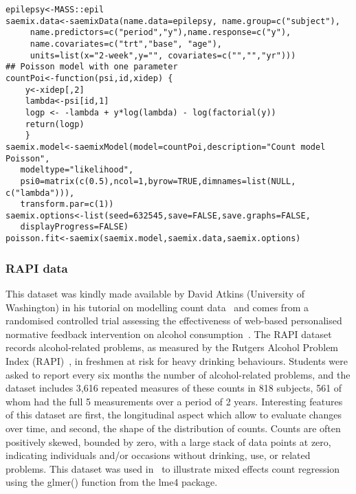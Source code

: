 \begin{verbatim}
epilepsy<-MASS::epil
saemix.data<-saemixData(name.data=epilepsy, name.group=c("subject"),
     name.predictors=c("period","y"),name.response=c("y"),
     name.covariates=c("trt","base", "age"), 
     units=list(x="2-week",y="", covariates=c("","","yr")))
## Poisson model with one parameter
countPoi<-function(psi,id,xidep) { 
    y<-xidep[,2]
    lambda<-psi[id,1]
    logp <- -lambda + y*log(lambda) - log(factorial(y))
    return(logp)
    }
saemix.model<-saemixModel(model=countPoi,description="Count model Poisson",
   modeltype="likelihood", 
   psi0=matrix(c(0.5),ncol=1,byrow=TRUE,dimnames=list(NULL, c("lambda"))), 
   transform.par=c(1))
saemix.options<-list(seed=632545,save=FALSE,save.graphs=FALSE, 
   displayProgress=FALSE)
poisson.fit<-saemix(saemix.model,saemix.data,saemix.options)
\end{verbatim}

\subsubsection{RAPI data} \label{sec:RAPICount}


This dataset was kindly made available by David Atkins (University of Washington) in his tutorial on modelling count data~\cite{Atkins13} and comes from a randomised controlled trial assessing the effectiveness of web-based personalised normative feedback intervention on alcohol consumption~\cite{Neighbors10a, Neighbors10b}. The {\sf RAPI dataset} records alcohol-related problems, as measured by the Rutgers Alcohol Problem Index (RAPI)~\cite{White89}, in freshmen at risk for heavy drinking behaviours. Students were asked to report every six months the number of alcohol-related problems, and the dataset includes 3,616 repeated measures of these counts in 818 subjects, 561 of whom had the full 5 measurements over a period of 2 years. Interesting features of this dataset are first, the longitudinal aspect which allow to evaluate changes over time, and second, the shape of the distribution of counts. Counts are often positively skewed, bounded by zero, with a large stack of data points at zero, indicating individuals and/or occasions without drinking, use, or related problems. This dataset was used in~\cite{Atkins13} to illustrate mixed effects count regression using the {\sf glmer()} function from the {\sf lme4} package.

